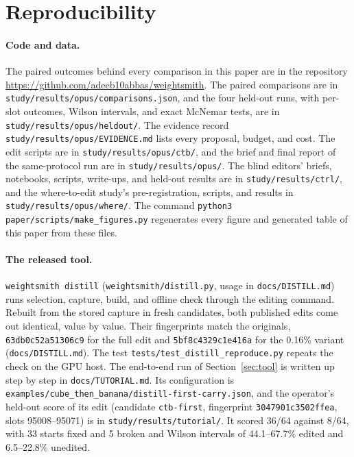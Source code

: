\documentclass{article}
\begin{document}
\FloatBarrier
\section{Reproducibility}
\label{app:repro}
\paragraph{Code and data.} The paired outcomes behind every comparison in this paper are in the repository \url{https://github.com/adeeb10abbas/weightsmith}. The paired comparisons are in \texttt{study/results/opus/comparisons.json}, and the four held-out runs, with per-slot outcomes, Wilson intervals, and exact McNemar tests, are in \texttt{study/results/opus/heldout/}. The evidence record \texttt{study/results/opus/EVIDENCE.md} lists every proposal, budget, and cost. The edit scripts are in \texttt{study/results/opus/ctb/}, and the brief and final report of the same-protocol run are in \texttt{study/results/opus/}. The blind editors' briefs, notebooks, scripts, write-ups, and held-out results are in \texttt{study/results/ctrl/}, and the where-to-edit study's pre-registration, scripts, and results in \texttt{study/results/opus/where/}. The command \texttt{python3 paper/scripts/make\_figures.py} regenerates every figure and generated table of this paper from these files.

\paragraph{The released tool.} \texttt{weightsmith distill} (\texttt{weightsmith/distill.py}, usage in \texttt{docs/DISTILL.md}) runs selection, capture, build, and offline check through the editing command. Rebuilt from the stored capture in fresh candidates, both published edits come out identical, value by value. Their fingerprints match the originals, \texttt{63db0c52a51306c9} for the full edit and \texttt{5bf8c4329c1e416a} for the 0.16\% variant (\texttt{docs/DISTILL.md}). The test \texttt{tests/test\_distill\_reproduce.py} repeats the check on the GPU host. The end-to-end run of Section~\ref{sec:tool} is written up step by step in \texttt{docs/TUTORIAL.md}. Its configuration is \texttt{examples/cube\_then\_banana/distill-first-carry.json}, and the operator's held-out score of its edit (candidate \texttt{ctb-first}, fingerprint \texttt{3047901c3502ffea}, slots 95008--95071) is in \texttt{study/results/tutorial/}. It scored 36/64 against 8/64, with 33 starts fixed and 5 broken and Wilson intervals of 44.1--67.7\% edited and 6.5--22.8\% unedited.
\end{document}
